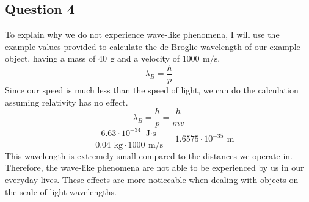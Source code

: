 \documentclass{article}
\begin{document}
\subsection*{Question 4}
To explain why we do not experience wave-like phenomena, I will use the example values provided to calculate the de Broglie wavelength of our example object, having a mass of $40\,\SI{}{\gram}$ and a velocity of $1000\,\SI{}{\meter/\second}$.
\[\lambda_B=\frac{h}{p}\]
Since our speed is much less than the speed of light, we can do the calculation assuming relativity has no effect.
\[\lambda_B=\frac{h}{p}=\frac{h}{mv}\]
\[=\frac{6.63\cdot10^{-34}\,\SI{}{\joule\cdot\second}}{0.04\,\SI{}{\kilogram}\cdot1000\,\SI{}{\meter/\second}}=1.6575\cdot10^{-35}\,\SI{}{\meter}\]
This wavelength is extremely small compared to the distances we operate in. Therefore, the wave-like phenomena are not able to be experienced by us in our everyday lives. These effects are more noticeable when dealing with objects on the scale of light wavelengths.
\end{document}

